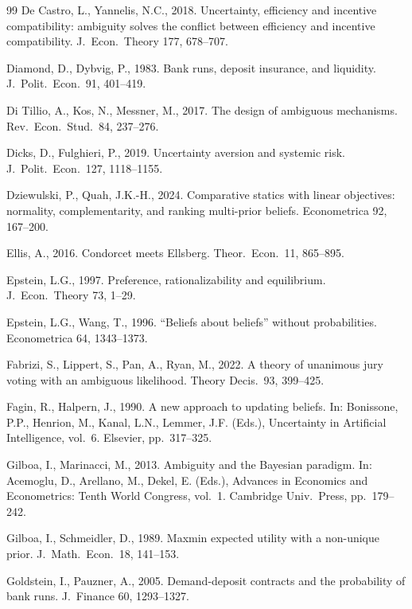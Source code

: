 \documentclass[12pt,a4paper]{article}
\theoremstyle{definition}
\theoremstyle{remark}
\begin{document}
\begin{thebibliography}{99}
De Castro, L., Yannelis, N.C., 2018. Uncertainty, efficiency and incentive compatibility: ambiguity solves the conflict between efficiency and incentive compatibility. J.\ Econ.\ Theory 177, 678--707.

Diamond, D., Dybvig, P., 1983. Bank runs, deposit insurance, and liquidity. J.\ Polit.\ Econ.\ 91, 401--419.

Di Tillio, A., Kos, N., Messner, M., 2017. The design of ambiguous mechanisms. Rev.\ Econ.\ Stud.\ 84, 237--276.

Dicks, D., Fulghieri, P., 2019. Uncertainty aversion and systemic risk. J.\ Polit.\ Econ.\ 127, 1118--1155.

Dziewulski, P., Quah, J.K.-H., 2024. Comparative statics with linear objectives: normality, complementarity, and ranking multi-prior beliefs. Econometrica 92, 167--200.

Ellis, A., 2016. Condorcet meets Ellsberg. Theor.\ Econ.\ 11, 865--895.

Epstein, L.G., 1997. Preference, rationalizability and equilibrium. J.\ Econ.\ Theory 73, 1--29.

Epstein, L.G., Wang, T., 1996. ``Beliefs about beliefs'' without probabilities. Econometrica 64, 1343--1373.

Fabrizi, S., Lippert, S., Pan, A., Ryan, M., 2022. A theory of unanimous jury voting with an ambiguous likelihood. Theory Decis.\ 93, 399--425.

Fagin, R., Halpern, J., 1990. A new approach to updating beliefs. In: Bonissone, P.P., Henrion, M., Kanal, L.N., Lemmer, J.F. (Eds.), Uncertainty in Artificial Intelligence, vol.\ 6. Elsevier, pp.\ 317--325.

Gilboa, I., Marinacci, M., 2013. Ambiguity and the Bayesian paradigm. In: Acemoglu, D., Arellano, M., Dekel, E. (Eds.), Advances in Economics and Econometrics: Tenth World Congress, vol.\ 1. Cambridge Univ.\ Press, pp.\ 179--242.

Gilboa, I., Schmeidler, D., 1989. Maxmin expected utility with a non-unique prior. J.\ Math.\ Econ.\ 18, 141--153.

Goldstein, I., Pauzner, A., 2005. Demand-deposit contracts and the probability of bank runs. J.\ Finance 60, 1293--1327.


\end{thebibliography}
\end{document}

